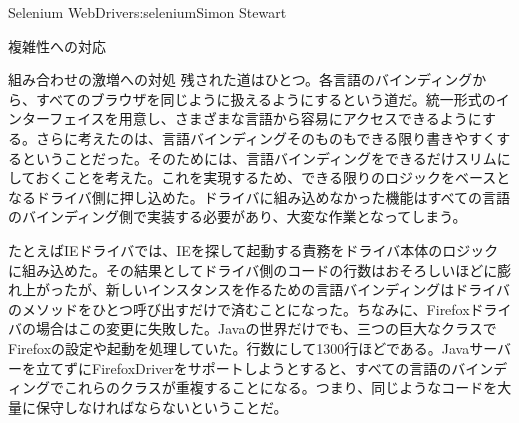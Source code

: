 \begin{aosachapter}{Selenium WebDriver}{s:selenium}{Simon Stewart}
\begin{aosasect1}{複雑性への対応}
\begin{aosasect2}{組み合わせの激増への対処}
残された道はひとつ。各言語のバインディングから、すべてのブラウザを同じように扱えるようにするという道だ。統一形式のインターフェイスを用意し、さまざまな言語から容易にアクセスできるようにする。さらに考えたのは、言語バインディングそのものもできる限り書きやすくするということだった。そのためには、言語バインディングをできるだけスリムにしておくことを考えた。これを実現するため、できる限りのロジックをベースとなるドライバ側に押し込めた。ドライバに組み込めなかった機能はすべての言語のバインディング側で実装する必要があり、大変な作業となってしまう。

たとえばIEドライバでは、IEを探して起動する責務をドライバ本体のロジックに組み込めた。その結果としてドライバ側のコードの行数はおそろしいほどに膨れ上がったが、新しいインスタンスを作るための言語バインディングはドライバのメソッドをひとつ呼び出すだけで済むことになった。ちなみに、Firefoxドライバの場合はこの変更に失敗した。Javaの世界だけでも、三つの巨大なクラスでFirefoxの設定や起動を処理していた。行数にして1300行ほどである。Javaサーバーを立てずにFirefoxDriverをサポートしようとすると、すべての言語のバインディングでこれらのクラスが重複することになる。つまり、同じようなコードを大量に保守しなければならないということだ。


\end{aosasect2}
\end{aosasect1}
\end{aosachapter}
